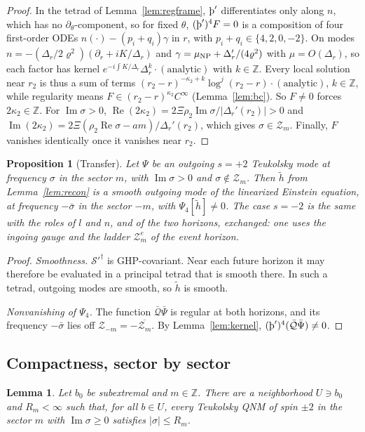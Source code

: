 \documentclass[11pt]{amsart}
\newtheorem{proposition}[theorem]{Proposition}
\newtheorem{lemma}[theorem]{Lemma}
\theoremstyle{definition}
\theoremstyle{remark}
\numberwithin{equation}{section}
\newcommand{\Th}{\text{\th}}
\newcommand{\Z}{\mathbb{Z}}
\renewcommand{\Im}{\operatorname{Im}}
\renewcommand{\Re}{\operatorname{Re}}
\begin{document}
\begin{proof}
In the tetrad of Lemma~\ref{lem:regframe}, $\Th'$ differentiates only along $n$, which has no $\partial_\theta$-component,
so for fixed $\theta$, $(\Th')^4F=0$ is a composition of four first-order ODEs $n(\cdot)-(p_i+q_i)\gamma$ in $r$, with
$p_i+q_i\in\{4,2,0,-2\}$. On modes $n=-(\Delta_r/2\varrho^2)(\partial_r+iK/\Delta_r)$ and $\gamma=\mu_{\rm NP}+\Delta_r'/(4\varrho^2)$ with
$\mu=O(\Delta_r)$, so each factor has kernel $e^{-i\int K/\Delta_r}\Delta_r^k\cdot(\text{analytic})$ with $k\in\Z$. Every local
solution near $r_2$ is thus a sum of terms $(r_2-r)^{-\kappa_2+k}\log^j(r_2-r)\cdot(\text{analytic})$, $k\in\Z$, while
regularity means $F\in(r_2-r)^{\kappa_2}C^\infty$ (Lemma~\ref{lem:bc}). So $F\ne0$ forces $2\kappa_2\in\Z$. For $\Im\sigma>0$,
$\Re(2\kappa_2)=2\Xi\rho_2\Im\sigma/|\Delta_r'(r_2)|>0$ and $\Im(2\kappa_2)=2\Xi(\rho_2\Re\sigma-am)/\Delta_r'(r_2)$, which gives
$\sigma\in\mathcal Z_m$. Finally, $F$ vanishes identically once it vanishes near $r_2$.
\end{proof}

\begin{proposition}[Transfer]\label{prop:transfer}
Let $\Psi$ be an outgoing $s=+2$ Teukolsky mode at frequency $\sigma$ in the sector $m$, with $\Im\sigma>0$ and
$\sigma\notin\mathcal Z_m$. Then $\tilde h$ from Lemma~\ref{lem:recon} is a smooth outgoing mode of the linearized
Einstein equation, at frequency $-\bar\sigma$ in the sector $-m$, with $\Psi_4[\tilde h]\ne0$. The case $s=-2$ is
the same with the roles of $l$ and $n$, and of the two horizons, exchanged: one uses the ingoing gauge and the
ladder $\mathcal Z_m^e$ of the event horizon.
\end{proposition}

\begin{proof}
\emph{Smoothness.} $\mathcal S'^\dagger$ is GHP-covariant. Near each future horizon it may therefore be evaluated in
a principal tetrad that is smooth there. In such a tetrad, outgoing modes are smooth, so $\tilde h$ is smooth.

\emph{Nonvanishing of $\Psi_4$.} The function $\bar{\mathcal Q}\bar\Psi$ is regular at both horizons, and its frequency
$-\bar\sigma$ lies off $\mathcal Z_{-m}=-\overline{\mathcal Z_m}$. By Lemma~\ref{lem:kernel},
$(\Th')^4(\bar{\mathcal Q}\bar\Psi)\ne0$.
\end{proof}

\subsection{Compactness, sector by sector}
\begin{lemma}\label{lem:compact}
Let $b_0$ be subextremal and $m\in\Z$. There are a neighborhood $U\ni b_0$ and $R_m<\infty$ such that, for all
$b\in U$, every Teukolsky QNM of spin $\pm2$ in the sector $m$ with $\Im\sigma\ge0$ satisfies $|\sigma|\le R_m$.
\end{lemma}
\end{document}
